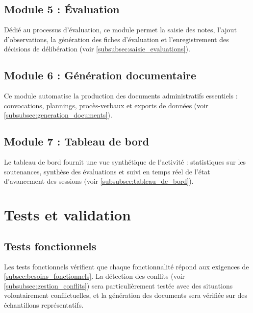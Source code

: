 \documentclass[12pt,a4paper]{article}
\begin{document}
\subsection{Module 5 : Évaluation}
\label{subsec:module_evaluation}

Dédié au processus d'évaluation, ce module permet la saisie des notes, l'ajout
d'observations, la génération des fiches d'évaluation et l'enregistrement des
décisions de délibération (voir \ref{subsubsec:saisie_evaluations}).

\subsection{Module 6 : Génération documentaire}
\label{subsec:module_documents}

Ce module automatise la production des documents administratifs essentiels :
convocations, plannings, procès-verbaux et exports de données (voir
\ref{subsubsec:generation_documents}).

\subsection{Module 7 : Tableau de bord}
\label{subsec:module_dashboard}

Le tableau de bord fournit une vue synthétique de l'activité : statistiques sur
les soutenances, synthèse des évaluations et suivi en temps réel de l'état
d'avancement des sessions (voir \ref{subsubsec:tableau_de_bord}).

\section{Tests et validation}
\label{sec:tests}

\subsection{Tests fonctionnels}
\label{subsec:tests_fonctionnels}

Les tests fonctionnels vérifient que chaque fonctionnalité répond aux exigences
de \ref{subsec:besoins_fonctionnels}. La détection des conflits (voir
\ref{subsubsec:gestion_conflits}) sera particulièrement testée avec des
situations volontairement conflictuelles, et la génération des documents sera
vérifiée sur des échantillons représentatifs.
\end{document}
